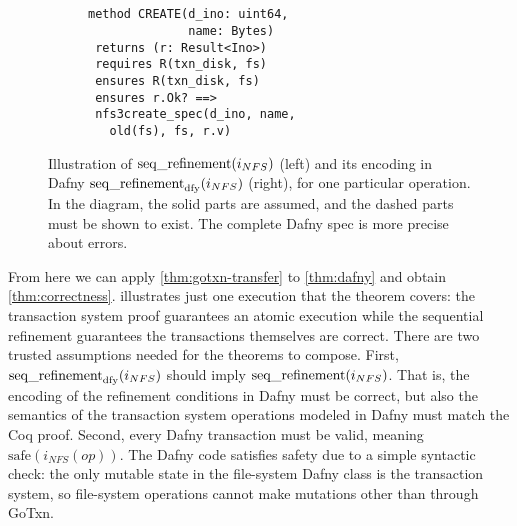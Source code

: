 \begin{figure}
  \centering
  \begin{subfigure}{0.25\textwidth}
    
  \end{subfigure}~~~\vrule~~~~%
\begin{subfigure}{0.3\textwidth}
  {\small
\begin{verbatim}

method CREATE(d_ino: uint64,
              name: Bytes)
 returns (r: Result<Ino>)
 requires R(txn_disk, fs)
 ensures R(txn_disk, fs)
 ensures r.Ok? ==>
 nfs3create_spec(d_ino, name,
   old(fs), fs, r.v)
\end{verbatim}
}
\end{subfigure}
  \caption[Illustration of sequential refinement and its Dafny encoding]%
  {Illustration of $\operatorname{seq\_refinement}(i_{NFS})$ (left) and its encoding
in Dafny $\operatorname{seq\_refinement}_{\mathrm{dfy}}(i_{NFS})$ (right), for one particular operation.
In the diagram, the solid parts are assumed, and the
dashed parts must be shown to exist. The complete Dafny spec is more precise about
errors.}
  \label{fig:refinement}
\end{figure}

From here we can apply \cref{thm:gotxn-transfer} to \cref{thm:dafny} and
obtain \cref{thm:correctness}.  illustrates
just one execution that the theorem covers: the transaction system proof guarantees an
atomic execution while the sequential refinement guarantees the transactions
themselves are correct. There are two trusted assumptions needed for the
theorems to compose. First, $\operatorname{seq\_refinement}_{\mathrm{dfy}}(i_{NFS})$ should imply
$\operatorname{seq\_refinement}(i_{NFS})$. That is, the encoding of the refinement
conditions in Dafny must be correct, but also the semantics of the transaction
system operations modeled in Dafny must match the Coq proof. Second, every Dafny
transaction must be valid, meaning $\mathrm{safe}(i_{NFS}(op))$. The Dafny code
satisfies safety due to a simple syntactic check: the only mutable state in the
file-system Dafny class is the transaction system, so file-system operations
cannot make mutations other than through GoTxn.

